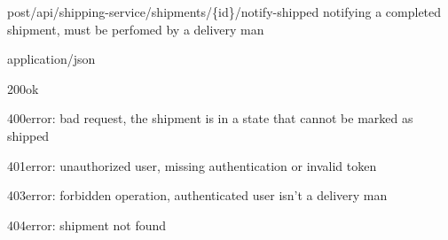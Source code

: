 \begin{apiRoute}{post}{/api/shipping-service/shipments/\{id\}/notify-shipped} {notifying a completed shipment, must be perfomed by a delivery man}
	\begin{routeParameter}
	\end{routeParameter}
	\begin{routeResponse}{application/json}
		\begin{routeResponseItem}{200}{ok}
			\begin{routeResponseItemBody}
			\end{routeResponseItemBody}
		\begin{routeResponseItem}{400}{error: bad request, the shipment is in a state that cannot be marked as shipped}
            \begin{routeResponseItemBody}
    	    \end{routeResponseItemBody} 
	    \end{routeResponseItem}
		\end{routeResponseItem}
	    \begin{routeResponseItem}{401}{error: unauthorized user, missing authentication or invalid token}
    	    \begin{routeResponseItemBody}
			\end{routeResponseItemBody}
		\end{routeResponseItem}
	    \begin{routeResponseItem}{403}{error: forbidden operation, authenticated user isn't a delivery man}
    	    \begin{routeResponseItemBody}
		    \end{routeResponseItemBody}
	    \end{routeResponseItem}	
	    \begin{routeResponseItem}{404}{error: shipment not found}
    		\begin{routeResponseItemBody}
        	\end{routeResponseItemBody} 
		\end{routeResponseItem}
	\end{routeResponse}
\end{apiRoute}